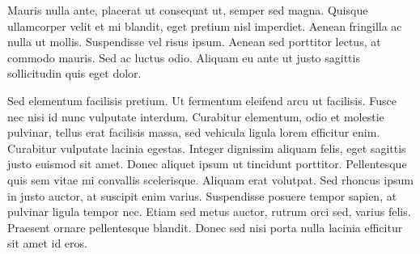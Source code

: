 \documentclass[a4paper,12pt]{article} %
\begin{document}
Mauris nulla ante, placerat ut consequat ut, semper sed magna. Quisque ullamcorper velit et mi blandit, eget pretium nisl imperdiet. Aenean fringilla ac nulla ut mollis. Suspendisse vel risus ipsum. Aenean sed porttitor lectus, at commodo mauris. Sed ac luctus odio. Aliquam eu ante ut justo sagittis sollicitudin quis eget dolor.

Sed elementum facilisis pretium. Ut fermentum eleifend arcu ut facilisis. Fusce nec nisi id nunc vulputate interdum. Curabitur elementum, odio et molestie pulvinar, tellus erat facilisis massa, sed vehicula ligula lorem efficitur enim. Curabitur vulputate lacinia egestas. Integer dignissim aliquam felis, eget sagittis justo euismod sit amet. Donec aliquet ipsum ut tincidunt porttitor. Pellentesque quis sem vitae mi convallis scelerisque. Aliquam erat volutpat. Sed rhoncus ipsum in justo auctor, at suscipit enim varius. Suspendisse posuere tempor sapien, at pulvinar ligula tempor nec. Etiam sed metus auctor, rutrum orci sed, varius felis. Praesent ornare pellentesque blandit. Donec sed nisi porta nulla lacinia efficitur sit amet id eros.
\end{document}
